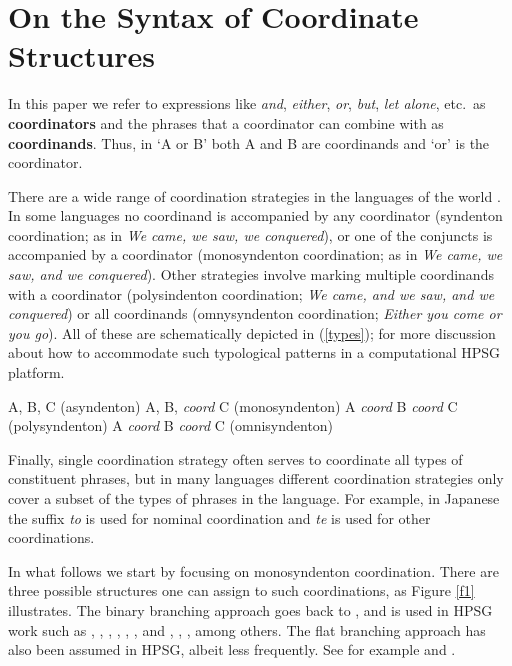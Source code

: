 \documentclass[output=paper]{langsci/langscibook}
\begin{document}
\section{On the Syntax of Coordinate Structures}

In this paper we refer to expressions like {\it and}, {\it either},  {\it or}, {\it but}, 
{\it let alone}, etc.\ as {\bf coordinators} and the phrases that a coordinator can combine with as  {\bf coordinands}.
Thus,  in `A or B' both A and B are coordinands and `or' is the coordinator. 

There are a wide range of coordination strategies in the languages of the world \citet{haspelmath}. In some languages no coordinand is accompanied by any coordinator (syndenton coordination; as in {\it We came, we saw, we conquered}), or one of the conjuncts is accompanied by a coordinator (monosyndenton coordination; as in {\it We came, we saw, and we conquered}). Other strategies involve marking multiple coordinands with a coordinator (polysindenton coordination;
{\it We came, and we saw, and we conquered}) or all coordinands (omnysyndenton coordination;
{\it Either you come or you go}).
All of these are schematically depicted in (\ref{types});
 \citet{Drellishak:Bender:05} for more discussion about how to accommodate such typological patterns in a computational HPSG platform.

\begin{exe}
\ex
\begin{xlista}
\ex A, B, C \hfill (asyndenton)
\ex A, B, {\it coord} C \hfill (monosyndenton)
\ex A {\it coord} B {\it coord} C \hfill (polysyndenton)
 A {\it coord} B {\it coord} C \hfill (omnisyndenton)
\end{xlista}\label{types}
\end{exe}



\noindent
 Finally, single coordination strategy often serves to coordinate all types of constituent phrases, but in many languages different coordination strategies only cover a subset of the types of phrases in the language. For example, in
Japanese the suffix {\it to} is used for nominal coordination
and {\it te} is used for other coordinations.

In what follows we start by focusing on monosyndenton coordination. There are three possible structures one can assign to such coordinations, as Figure \ref{f1} illustrates. The binary branching approach goes back to \citet{yngve}, and is used in HPSG work such as
\citet{pollardsag}, \citet{Yatabe:03}, \citet{berthold03},
\citet{Beavers}, \citet{Drellishak:Bender:05}, \citet{Abeille:05}, and
\citet{Borsley:05}, \citet{chavesthesis}, \citet{chavesextr}, among others. The flat branching approach has also been  assumed in HPSG, albeit less frequently. See for example
\citet{sagwasowbender} and  \citet{Sag:03}.
\end{document}
